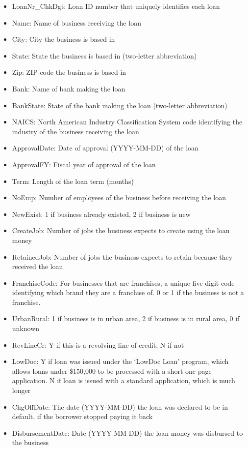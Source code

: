 \documentclass[11pt]{article}
\begin{document}
\begin{itemize}
\item LoanNr\_ChkDgt:	Loan ID number that uniquely identifies each loan
\item Name: 	Name of business receiving the loan
\item City: 	City the business is based in
\item State: 	State the business is based in (two-letter abbreviation)
\item Zip: 	ZIP code the business is based in
\item Bank: 	Name of bank making the loan
\item BankState: 	State of the bank making the loan (two-letter abbreviation)
\item NAICS: 	North American Industry Classification System code identifying the industry of the business receiving the loan
\item ApprovalDate: 	Date of approval (YYYY-MM-DD) of the loan
\item ApprovalFY: 	Fiscal year of approval of the loan
\item Term: 	Length of the loan term (months)
\item NoEmp: 	Number of employees of the business before receiving the loan
\item NewExist: 	1 if business already existed, 2 if business is new
\item CreateJob: 	Number of jobs the business expects to create using the loan money
\item RetainedJob: 	Number of jobs the business expects to retain because they received the loan
\item FranchiseCode: 	For businesses that are franchises, a unique five-digit code identifying which brand they are a franchise of. 0 or 1 if the business is not a franchise.
\item UrbanRural: 	1 if business is in urban area, 2 if business is in rural area, 0 if unknown
\item RevLineCr: 	Y if this is a revolving line of credit, N if not
\item LowDoc: 	Y if loan was issued under the `LowDoc Loan' program, which allows loans under \$150,000 to be processed with a short one-page application. N if loan is issued with a standard application, which is much longer
\item ChgOffDate: 	The date (YYYY-MM-DD) the loan was declared to be in default, if the borrower stopped paying it back
\item DisbursementDate: 	Date (YYYY-MM-DD) the loan money was disbursed to the business

\end{itemize}
\end{document}
